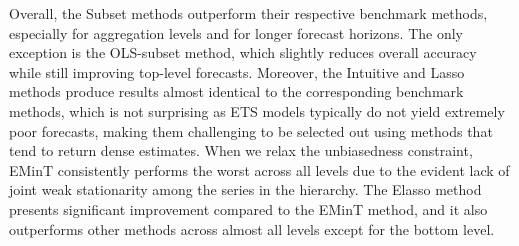 \documentclass[
  12pt,
  11pt]{article}
\begin{document}
Overall, the Subset methods outperform their respective benchmark
methods, especially for aggregation levels and for longer forecast
horizons. The only exception is the OLS-subset method, which slightly
reduces overall accuracy while still improving top-level forecasts.
Moreover, the Intuitive and Lasso methods produce results almost
identical to the corresponding benchmark methods, which is not
surprising as ETS models typically do not yield extremely poor
forecasts, making them challenging to be selected out using methods that
tend to return dense estimates. When we relax the unbiasedness
constraint, EMinT consistently performs the worst across all levels due
to the evident lack of joint weak stationarity among the series in the
hierarchy. The Elasso method presents significant improvement compared
to the EMinT method, and it also outperforms other methods across almost
all levels except for the bottom level.
\end{document}
